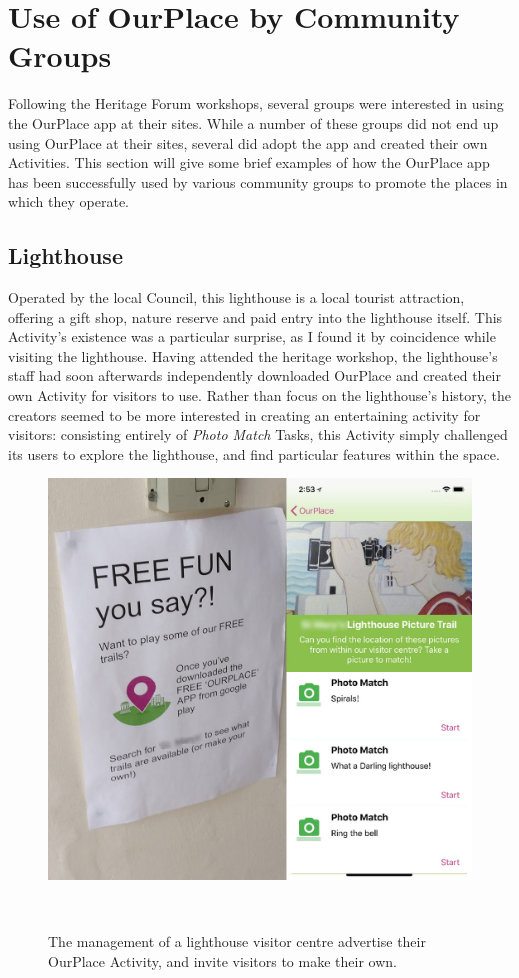 \section{Use of OurPlace by Community Groups}

Following the Heritage Forum workshops, several groups were interested in using the OurPlace app at their sites. While a number of these groups did not end up using OurPlace at their sites, several did adopt the app and created their own Activities. This section will give some brief examples of how the OurPlace app has been successfully used by various community groups to promote the places in which they operate.

\subsection{Lighthouse}

Operated by the local Council, this lighthouse is a local tourist attraction, offering a gift shop, nature reserve and paid entry into the lighthouse itself. This Activity's existence was a particular surprise, as I found it by coincidence while visiting the lighthouse. Having attended the heritage workshop, the lighthouse's staff had soon afterwards independently downloaded OurPlace and created their own Activity for visitors to use. Rather than focus on the lighthouse's history, the creators seemed to be more interested in creating an entertaining activity for visitors: consisting entirely of \textit{Photo Match} Tasks, this Activity simply challenged its users to explore the lighthouse, and find particular features within the space.

\begin{figure}
  \centering
  \includegraphics[width=0.7\columnwidth]{images/chapter06/OurPlaceLighthouse.jpg}
  \caption[An OurPlace Activity at a lighthouse]{The management of a lighthouse visitor centre advertise their OurPlace Activity, and invite visitors to make their own.}~\label{fig:OurPlaceLighthouse}
\end{figure}

